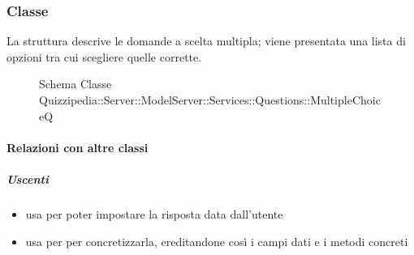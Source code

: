 \subsubsection{Classe }
La struttura descrive le domande a scelta multipla; viene presentata una lista di opzioni tra cui scegliere quelle corrette.
\begin{figure}[H]
\centering
\noindent{}
\caption[Schema Classe MultipleChoiceQ]{Schema Classe Quizzipedia::Server::ModelServer::Services::Questions::MultipleChoiceQ}
\end{figure}
\paragraph{Relazioni con altre classi}
\subparagraph{Uscenti}
\begin{itemize}
\item usa  per poter impostare la risposta data dall'utente
\item usa  per per concretizzarla, ereditandone così i campi dati e i metodi concreti
\end{itemize}
